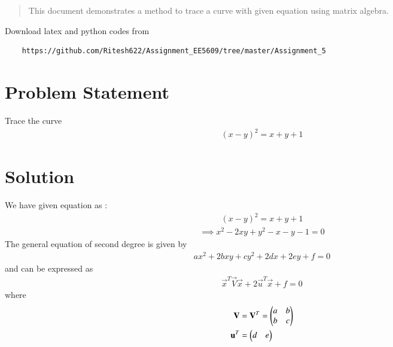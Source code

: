 \documentclass[journal,12pt,twocolumn]{IEEEtran}
\begin{document}
\maketitle
\newpage
\bigskip
\renewcommand{\thefigure}{\theenumi}
\renewcommand{\thetable}{\theenumi}
%		
%		
		\date{Today}
		
	\begin{abstract}
		This document demonstrates a method to trace a curve with given equation using matrix algebra.
		\end{abstract}	
	
		Download latex and python codes from 
		\begin{lstlisting}
	https://github.com/Ritesh622/Assignment_EE5609/tree/master/Assignment_5
		\end{lstlisting}	
	\section{Problem Statement} 
	Trace the curve 
	\begin{align}
	\left(x-y\right)^2 = x+y+1
	\label{eq0}
	\end{align}
	
	\section{Solution}	
	
	We have given equation as :
	\begin{align}
\left(x-y\right)^2 = x+y+1
\end{align}	
\begin{align}
\implies x^2  -2xy + y^2 -x - y -1 = 0
\label{eq1}
\end{align}
The general equation of second degree is given by
\begin{align}
ax^2+2bxy+cy^2+2dx+2ey+f=0 \label{eq2}
\end{align}
and can be expressed as
\begin{align}
\vec{x}^T\vec{V}\vec{x}+2\vec{u}^T\vec{x}+f=0 \label{eq3}
\end{align}
where
\begin{align}
\mathbf{V} &= \mathbf{V}^T = \begin{pmatrix}a & b \\ b & c\end{pmatrix}
\\
\mathbf{u}^T &= \begin{pmatrix}d & e\end{pmatrix}
\end{align}
\end{document}
